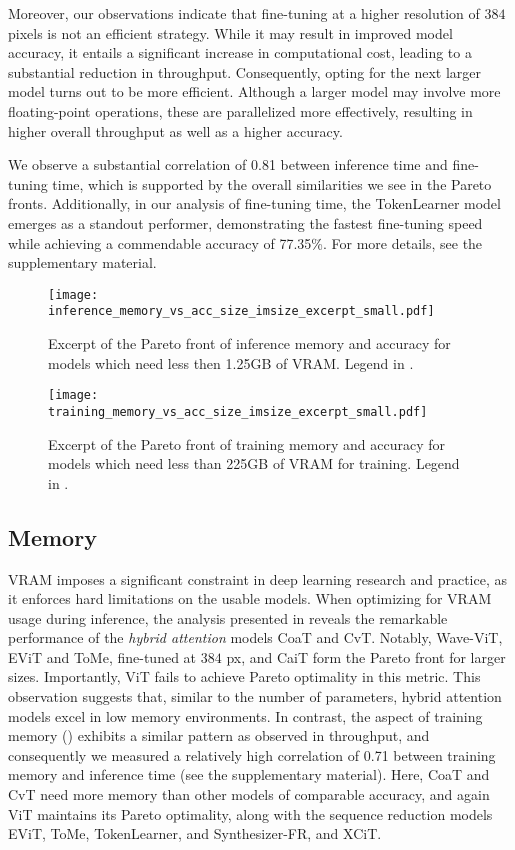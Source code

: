 Moreover, our observations indicate that fine-tuning at a higher resolution of $384$ pixels is not an efficient strategy. 
While it may result in improved model accuracy, it entails a significant increase in computational cost, leading to a substantial reduction in throughput. 
Consequently, opting for the next larger model turns out to be more efficient. 
Although a larger model may involve more floating-point operations, these are parallelized more effectively, resulting in higher overall throughput as well as a higher  accuracy.

We observe a substantial correlation of 0.81 between inference time and fine-tuning time, which is supported by the overall similarities we see in the Pareto fronts.
Additionally, in our analysis of fine-tuning time, the TokenLearner model emerges as a standout performer, demonstrating the fastest fine-tuning speed while achieving a commendable accuracy of 77.35\%.
For more details, see the supplementary material.


\begin{figure}[ht]
	\centering
	\texttt{[image: inference\_memory\_vs\_acc\_size\_imsize\_excerpt\_small.pdf]}
	\caption{Excerpt of the Pareto front of inference memory and accuracy for models which need less then 1.25GB of VRAM. Legend in .}
	\label{fig:inference_memory_vs_acc_size_imsize}
\end{figure}
\begin{figure}[ht]
	\centering
	\texttt{[image: training\_memory\_vs\_acc\_size\_imsize\_excerpt\_small.pdf]}
	\caption{Excerpt of the Pareto front of training memory and accuracy for models which need less than 225GB of VRAM for training. Legend in .}
	\label{fig:training_memory_vs_acc_size_imsize}
\end{figure}

\subsection{Memory}
VRAM imposes a significant constraint in deep learning research and practice, as it enforces hard limitations on the usable models.
When optimizing for VRAM usage during inference, the analysis presented in  reveals the remarkable performance of the \emph{hybrid attention} models CoaT and CvT.
Notably, Wave-ViT, 
EViT and ToMe, fine-tuned at 
$384$ px, and CaiT form the Pareto front for larger sizes. 
Importantly, ViT fails to achieve Pareto optimality in this metric.
This observation suggests that, similar to the number of parameters, hybrid attention models excel in low memory environments.
In contrast, the aspect of training memory () exhibits a similar pattern as observed in throughput, and consequently we measured a relatively high correlation of 0.71 between training memory and inference time (see the supplementary material).
Here, CoaT and CvT need more memory than other models of comparable accuracy, and again 
ViT maintains its Pareto optimality, along with the sequence reduction models EViT, ToMe, TokenLearner, and Synthesizer-FR, and XCiT. 


